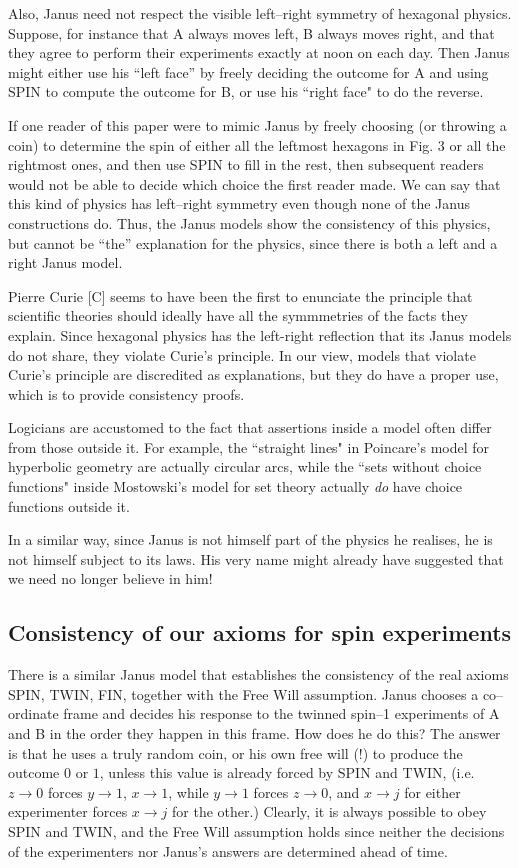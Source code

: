 \documentclass[12pt]{amsart}
\begin{document}
Also, Janus need not respect the visible left--right symmetry of hexagonal physics.  
Suppose, for instance that A always moves left, B always moves right,
and that they agree to perform their experiments exactly at noon on each
day.  Then Janus might either use his ``left face'' by freely deciding
the outcome for A and using SPIN to compute the outcome for B,
or use his ``right face" to do the reverse.

If one reader of this paper were to mimic Janus by freely choosing (or
throwing a coin) to determine the spin of either all the leftmost
hexagons in Fig. 3 or all the rightmost ones, and then use SPIN
to fill in the rest, then subsequent readers would not be able to
decide which choice the first reader made.  We can say that this kind of
physics has left--right symmetry even though none of the Janus
constructions do.  Thus, the Janus models show the consistency of this
physics, but cannot be ``the'' explanation for the physics, since there
is both a left and a right Janus model.

Pierre Curie [C] seems to have been the first to enunciate the principle that 
scientific theories should ideally have all the symmmetries of the facts they explain.  Since hexagonal physics has the left-right reflection that its Janus models do not share,
they violate Curie's principle.  In our view, models that violate Curie's principle 
are discredited as explanations, but they do have a proper use, which is to provide consistency proofs.  

Logicians are accustomed to the fact that assertions inside a model often differ
from those outside it.  For example, the ``straight lines" in Poincare's model for
hyperbolic geometry are actually circular arcs, while the ``sets without choice
functions" inside Mostowski's model for set theory actually {\em do} have choice
functions outside it.

  In a similar way, since Janus is not himself part of the physics he realises,  
he is not himself subject to its laws.  His very name might already have suggested 
that we need no longer believe in him!

\subsection{ Consistency of our axioms for spin experiments}%
There is a similar Janus model that establishes the consistency of the real 
axioms SPIN, TWIN, FIN, together with the Free Will assumption. 
Janus chooses a co--ordinate frame and
decides his response to the twinned spin--1 experiments of A and B in
the order they happen in this frame.  How does he do this?  The answer is
that he uses a truly random coin, or his own free will (!) to produce
the outcome $0$ or $1$, unless this value is already forced by SPIN and
TWIN, (i.e. $z \to 0$ forces $y \to 1$, $x \to 1$, while $y\to 1$ forces
$z \to 0$, and $x \to j$ for either experimenter forces $x\to j$ for the other.)
Clearly, it is always possible to obey SPIN and TWIN, and the Free Will
assumption holds since neither the decisions of the experimenters nor Janus's 
answers are determined ahead of time.
\end{document}
